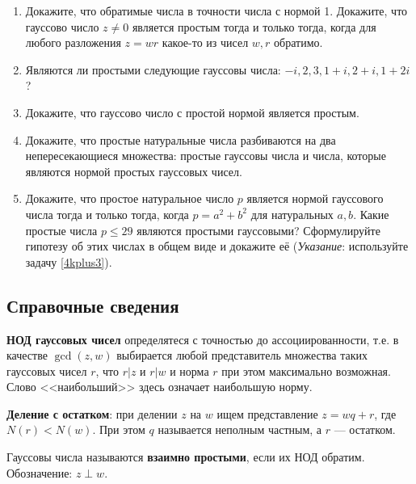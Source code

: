 \begin{enumerate}
\item \ipunkt Докажите, что обратимые
числа в точности числа с нормой 1. \ipunkt Докажите, что гауссово число $z\ne 0$ является простым тогда и только тогда, когда для любого разложения $z = wr$ какое-то из чисел $w, r$ обратимо.
\item Являются ли простыми следующие гауссовы числа: $-i, 2, 3, 1 + i, 2 + i, 1 + 2i$?
\item Докажите, что гауссово число с простой нормой является простым.
\item Докажите, что простые натуральные числа разбиваются на два непересекающиеся множества:
 простые гауссовы числа и числа, которые являются нормой простых гауссовых чисел.
\item \ipunkt Докажите, что простое натуральное число $p$ является нормой гауссового числа тогда и только тогда,
когда $p = a^2 +b^2$ для натуральных $a, b$. \ipunkt Какие простые числа $p\le 29$ являются простыми гауссовыми?
\ipunkt Сформулируйте гипотезу об этих числах в общем виде и докажите её (\textit{Указание}: используйте
задачу \ref{4kplus3}).

\end{enumerate}

\subsection*{Справочные сведения}

\textbf{НОД гауссовых чисел} определятеся с точностью до ассоциированности, т.е. в качестве $\gcd(z,w)$ выбирается любой представитель множества таких гауссовых чисел $r$, что $r|z$ и $r|w$ и норма $r$ при этом максимально возможная. Слово <<наибольший>> здесь означает наибольшую норму.

\textbf{Деление с остатком}: при делении $z$ на $w$ ищем представление $z=wq+r$, где $N(r)<N(w)$. При этом $q$ называется неполным частным, а $r$ --- остатком.

Гауссовы числа называются \textbf{взаимно простыми}, если их НОД обратим. Обозначение: $z\perp w$.

